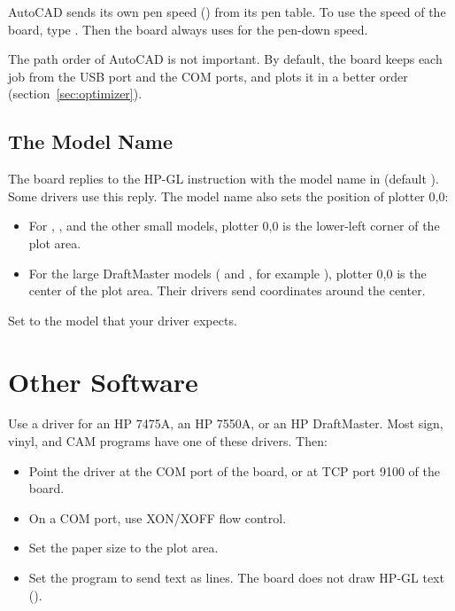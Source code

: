 \begin{note}
\notelabel AutoCAD sends its own pen speed () from its pen table.
To use the speed of the board, type . Then the board
always uses  for the pen-down speed.
\end{note}

The path order of AutoCAD is not important. By default, the board keeps each
job from the USB port and the COM ports, and plots it in a better order
(section~\ref{sec:optimizer}).

\subsection{The Model Name}

The board replies to the HP-GL  instruction with the model name in
 (default ). Some drivers use this reply. The model
name also sets the position of plotter 0,0:

\begin{itemize}
  \item For , , and the other small models, plotter
        0,0 is the lower-left corner of the plot area.
  \item For the large DraftMaster models ( and , for
        example ), plotter 0,0 is the center of the plot area.
        Their drivers send coordinates around the center.
\end{itemize}

Set  to the model that your driver expects.

\section{Other Software}

Use a driver for an HP 7475A, an HP 7550A, or an HP DraftMaster. Most sign,
vinyl, and CAM programs have one of these drivers. Then:

\begin{itemize}
  \item Point the driver at the COM port of the board, or at TCP port 9100 of
        the board.
  \item On a COM port, use XON/XOFF flow control.
  \item Set the paper size to the plot area.
  \item Set the program to send text as lines. The board does not draw HP-GL
        text ().
\end{itemize}

